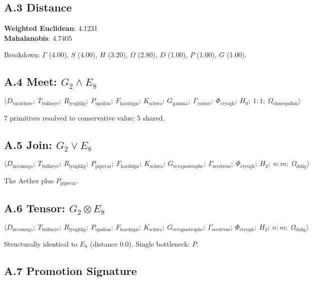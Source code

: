 \documentclass[12pt,a4paper]{article}
\begin{document}
\subsection{A.3 Distance}

\textbf{Weighted Euclidean}: 4.1231 \\
\textbf{Mahalanobis}: 4.7405

Breakdown: $\Gamma$ (4.00), $S$ (4.00), $H$ (3.20), $\Omega$ (2.80), $D$ (1.00), $P$ (1.00), $G$ (1.00).

\subsection{A.4 Meet: $G_2 \wedge E_8$}

\[\langle D_{\text{turnthree}};\ T_{\text{bullseye}};\ R_{\text{lyoghlig}};\ P_{\text{upsilon}};\ F_{\text{hardsign}};\ K_{\text{schwa}};\ G_{\text{gamma}};\ \Gamma_{\text{corner}};\ \Phi_{\text{ctyogh}};\ H_0;\ 1{:}1;\ \Omega_{\text{closeepsilon}} \rangle\]

7 primitives resolved to conservative value; 5 shared.

\subsection{A.5 Join: $G_2 \vee E_8$}

\[\langle D_{\text{invomega}};\ T_{\text{bullseye}};\ R_{\text{lyoghlig}};\ P_{\text{pipevar}};\ F_{\text{hardsign}};\ K_{\text{schwa}};\ G_{\text{revapostrophe}};\ \Gamma_{\text{secstress}};\ \Phi_{\text{ctyogh}};\ H_2;\ n{:}m;\ \Omega_{\text{dzlig}} \rangle\]

The Aether plus $P_{\text{pipevar}}$.

\subsection{A.6 Tensor: $G_2 \otimes E_8$}

\[\langle D_{\text{invomega}};\ T_{\text{bullseye}};\ R_{\text{lyoghlig}};\ P_{\text{upsilon}};\ F_{\text{hardsign}};\ K_{\text{schwa}};\ G_{\text{revapostrophe}};\ \Gamma_{\text{secstress}};\ \Phi_{\text{ctyogh}};\ H_2;\ n{:}m;\ \Omega_{\text{dzlig}} \rangle\]

Structurally identical to $E_8$ (distance 0.0). Single bottleneck: $P$.

\subsection{A.7 Promotion Signature}
\end{document}
